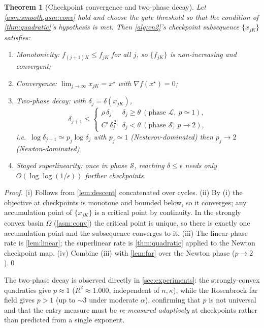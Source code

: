 \documentclass[11pt]{article}
\newtheorem{theorem}{Theorem}
\begin{document}
\begin{theorem}[Checkpoint convergence and two-phase decay]
\label{thm:checkpoint}
Let \cref{asm:smooth,asm:conv} hold and choose the gate threshold so that the
condition of \cref{thm:quadratic}'s hypothesis is met. Then
\cref{alg:cn2}'s checkpoint subsequence $\{x_{jK}\}$ satisfies:
\begin{enumerate}[label=(\roman*)]
  \item \emph{Monotonicity}: $f_{(j+1)K}\le f_{jK}$ for all $j$, so $\{f_{jK}\}$
        is non-increasing and convergent;
  \item \emph{Convergence}: $\lim_{j\to\infty}x_{jK}=x^\star$ with
        $\nabla f(x^\star)=0$;
  \item \emph{Two-phase decay}: with $\delta_j=\delta(x_{jK})$,
        $$\delta_{j+1}\le
        \begin{cases}
          \rho\,\delta_j & \delta_j\ge\theta \ (\text{phase }\mathcal{L},\ p\simeq1),\\
          C'\,\delta_j^{\,2} & \delta_j<\theta\ (\text{phase }\mathcal{S},\ p\to2),
        \end{cases}$$
        i.e.\ $\log\delta_{j+1}\simeq p_j\log\delta_j$ with $p_j\simeq1$
        (Nesterov-dominated) then $p_j\to2$ (Newton-dominated).
  \item \emph{Staged superlinearity}: once in phase $\mathcal{S}$, reaching
        $\delta\le\epsilon$ needs only $O(\log\log(1/\epsilon))$ further
        checkpoints.
\end{enumerate}
\end{theorem}

\begin{proof}
(i) Follows from \cref{lem:descent} concatenated over cycles. (ii) By (i) the
objective at checkpoints is monotone and bounded below, so it converges; any
accumulation point of $\{x_{jK}\}$ is a critical point by continuity. In the
strongly convex basin $\Omega$ (\cref{asm:conv}) the critical point is unique,
so there is exactly one accumulation point and the subsequence converges to it.
(iii) The linear-phase rate is \cref{lem:linear}; the superlinear rate is
\cref{thm:quadratic} applied to the Newton checkpoint map. (iv) Combine (iii)
with \cref{lem:far} over the Newton phase ($p\to2$).\qed
\end{proof}

The two-phase decay is observed directly in \cref{sec:experiments}: the
strongly-convex quadratics give $p\approx1$ ($R^2\approx1.000$, independent of
$n,\kappa$), while the Rosenbrock far field gives $p>1$ (up to $\sim3$ under
moderate $\alpha$), confirming that $p$ is not universal and that the entry
measure must be \emph{re-measured adaptively} at checkpoints rather than
predicted from a single exponent.
\end{document}
